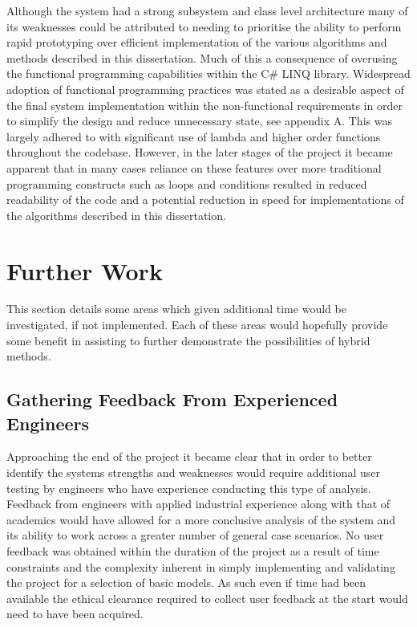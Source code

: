 \noindent
Although the system had a strong subsystem and class level architecture many of its weaknesses could be attributed to needing to prioritise the ability to perform rapid prototyping over efficient implementation of the various algorithms and methods described in this dissertation. Much of this a consequence of overusing the functional programming capabilities within the C\# LINQ library. Widespread adoption of functional programming practices was stated as a desirable aspect of the final system implementation within the non-functional requirements in order to simplify the design and reduce unnecessary state, see appendix A. This was largely adhered to with significant use of lambda and higher order functions throughout the codebase. However, in the later stages of the project it became apparent that in many cases reliance on these features over more traditional programming constructs such as loops and conditions resulted in reduced readability of the code and a potential reduction in speed for implementations of the algorithms described in this dissertation.


\section{Further Work}
This section details some areas which given additional time would be investigated, if not implemented. Each of these areas would hopefully provide some benefit in assisting to further demonstrate the possibilities of hybrid methods.

\subsection{Gathering Feedback From Experienced Engineers}
Approaching the end of the project it became clear that in order to better identify the systems strengths and weaknesses would require additional user testing by engineers who have experience conducting this type of analysis. Feedback from engineers with applied industrial experience along with that of academics would have allowed for a more conclusive analysis of the system and its ability to work across a greater number of general case scenarios. No user feedback was obtained within the duration of the project as a result of time constraints and the complexity inherent in simply implementing and validating the project for a selection of basic models. As such even if time had been available the ethical clearance required to collect user feedback at the start would need to have been acquired.


